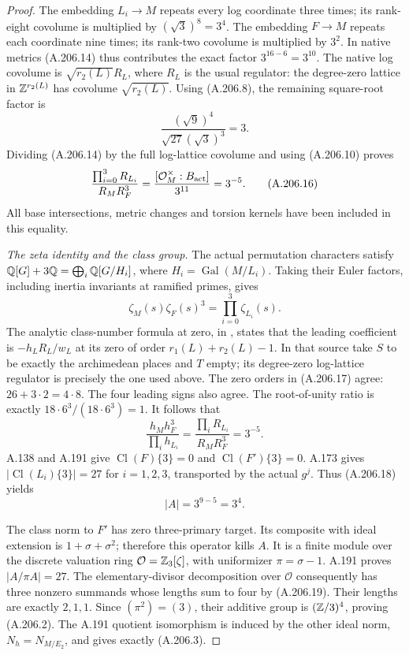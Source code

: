 \begin{proof}
The embedding \(L_i\to M\) repeats every log coordinate
three times; its rank-eight covolume is multiplied by
\((\sqrt3)^8=3^4\).  The embedding \(F\to M\)
repeats each coordinate nine times; its rank-two covolume
is multiplied by \(3^2\).  In native metrics (A.206.14)
thus contributes the exact factor \(3^{16-6}=3^{10}\).
The native log covolume is \(\sqrt{r_2(L)}R_L\), where
\(R_L\) is the usual regulator: the degree-zero lattice
in \(\mathbb Z^{r_2(L)}\) has covolume \(\sqrt{r_2(L)}\).
Using (A.206.8), the remaining square-root factor is
\[
       \frac{(\sqrt9)^4}{\sqrt{27}(\sqrt3)^3}=3.
\tag{A.206.15}
\]
Dividing (A.206.14) by the full log-lattice covolume
and using (A.206.10) proves
\[
 \frac{\prod_{i=0}^3 R_{L_i}}{R_M R_F^3}
  =\frac{[\mathcal O_M^\times:B_{\rm act}]}{3^{11}}
  =3^{-5}.
\tag{A.206.16}
\]
All base intersections, metric changes and torsion kernels
have been included in this equality.

\emph{The zeta identity and the class group.}
The actual permutation characters satisfy
\(\mathbb Q[G]+3\mathbb Q=\bigoplus_i\mathbb Q[G/H_i]\), where
\(H_i=\operatorname{Gal}(M/L_i)\).
Taking their Euler factors, including inertia invariants
at ramified primes, gives
\[
                \zeta_M(s)\zeta_F(s)^3
                     =\prod_{i=0}^3\zeta_{L_i}(s).
\tag{A.206.17}
\]
The analytic class-number formula at zero, in
\cite[Section 2, Theorem 2.1, printed p.~304]{BIR_Darmon1995},
states that the leading coefficient is \(-h_LR_L/w_L\)
at its zero of order \(r_1(L)+r_2(L)-1\).
In that source take \(S\) to be exactly the archimedean
places and \(T\) empty; its degree-zero log-lattice
regulator is precisely the one used above.
The zero orders in (A.206.17) agree:
\(26+3\cdot2=4\cdot8\).  The four leading signs
also agree.  The root-of-unity ratio is exactly
\(18\cdot6^3/(18\cdot6^3)=1\).
It follows that
\[
       \frac{h_Mh_F^3}{\prod_i h_{L_i}}
              =\frac{\prod_iR_{L_i}}{R_MR_F^3}=3^{-5}.
\tag{A.206.18}
\]
A.138 and A.191 give \(\operatorname{Cl}(F)\{3\}=0\)
and \(\operatorname{Cl}(F')\{3\}=0\).
A.173 gives \(|\operatorname{Cl}(L_i)\{3\}|=27\)
for \(i=1,2,3\), transported by the actual \(g^j\).
Thus (A.206.18) yields
\[
                          |A|=3^{9-5}=3^4.
\tag{A.206.19}
\]

The class norm to \(F'\) has zero three-primary target.
Its composite with ideal extension is
\(1+\sigma+\sigma^2\); therefore this operator kills
\(A\).  It is a finite module over the discrete valuation
ring \(\mathcal O=\mathbb Z_3[\zeta]\), with uniformizer
\(\pi=\sigma-1\).  A.191 proves
\(|A/\pi A|=27\).  The elementary-divisor decomposition
over \(\mathcal O\) consequently has three nonzero
summands whose lengths sum to four by (A.206.19).
Their lengths are exactly \(2,1,1\).
Since \((\pi^2)=(3)\), their additive group is
\((\mathbb Z/3)^4\), proving (A.206.2).
The A.191 quotient isomorphism is induced by the other
ideal norm, \(N_h=N_{M/E_2}\), and gives exactly
(A.206.3).


\end{proof}
